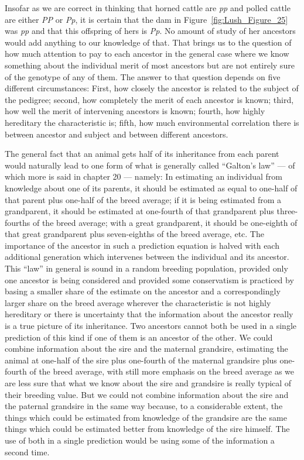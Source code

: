 Insofar as we are correct in thinking that horned cattle are \textit{pp} and
polled cattle are either \textit{PP} or \textit{Pp}, it is certain that the dam
in Figure~\ref{fig:Lush_Figure_25}
was \textit{pp} and that this offspring of hers is \textit{Pp}. No amount of study of her
ancestors would add anything to our knowledge of that. That brings us
to the question of how much attention to pay to each ancestor in the
general case where we know something about the individual merit of
most ancestors but are not entirely sure of the genotype of any of them.
The answer to that question depends on five different circumstances:
First, how closely the ancestor is related to the subject of the pedigree;
second, how completely the merit of each ancestor is known; third, how
well the merit of intervening ancestors is known; fourth, how highly
hereditary the characteristic is; fifth, how much environmental correlation
there is between ancestor and subject and between different
ancestors.

The general fact that an animal gets half of its inheritance from
each parent would naturally lead to one form of what is generally called
``Galton's law'' --- of which more is said in chapter 20 --- namely: In estimating
an individual from knowledge about one of its parents, it
should be estimated as equal to one-half of that parent plus one-half of
the breed average; if it is being estimated from a grandparent, it should
be estimated at one-fourth of that grandparent plus three-fourths of the
breed average; with a great grandparent, it should be one-eighth of that
great grandparent plus seven-eighths of the breed average, etc. The
importance of the ancestor in such a prediction equation is halved with
each additional generation which intervenes between the individual
and its ancestor. This ``law'' in general is sound in a random breeding
population, provided only one ancestor is being considered and provided
some conservatism is practiced by basing a smaller share of the
estimate on the ancestor and a correspondingly larger share on the
breed average wherever the characteristic is not highly hereditary or
there is uncertainty that the information about the ancestor really is a
true picture of its inheritance. Two ancestors cannot both be used in a
single prediction of this kind if one of them is an ancestor of the other.
We could combine information about the sire and the maternal grandsire,
estimating the animal at one-half of the sire plus one-fourth of the
maternal grandsire plus one-fourth of the breed average, with still more
emphasis on the breed average as we are less sure that what we know
about the sire and grandsire is really typical of their breeding value.
But we could not combine information about the sire and the paternal
grandsire in the same way because, to a considerable extent, the things
which could be estimated from knowledge of the grandsire are the same
things which could be estimated better from knowledge of the sire himself.
The use of both in a single prediction would be using some of the
information a second time.

